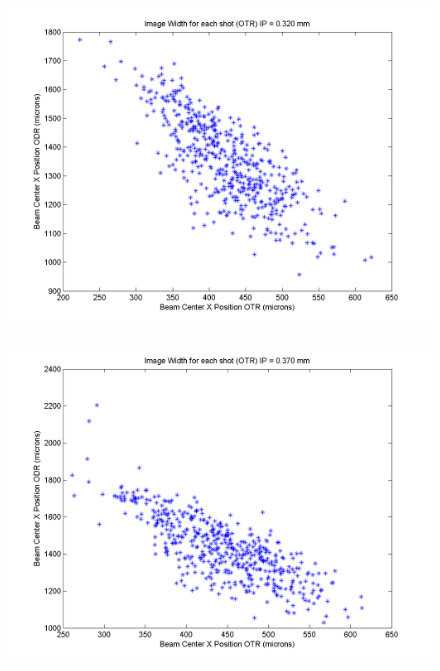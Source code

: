 \documentclass[12pt]{article}
\begin{document}
\begin{figure}
\begin{center}
\includegraphics[scale=0.5]{Figures/XPosition_OTRODR_320.PNG}
\caption{}
\end{center}
\end{figure}

\begin{figure}
\begin{center}
\includegraphics[scale=0.5]{Figures/XPosition_OTRODR_370.PNG}
\caption{}
\end{center}
\end{figure}
\end{document}
